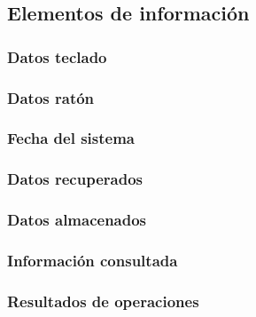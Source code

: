 \subsection{Elementos de información}

  \subsubsection{Datos teclado}

  

  \subsubsection{Datos ratón}

  

  \subsubsection{Fecha del sistema}

  

  \subsubsection{Datos recuperados}

  

  \subsubsection{Datos almacenados}

  

  \subsubsection{Información consultada}

  

  \subsubsection{Resultados de operaciones}

